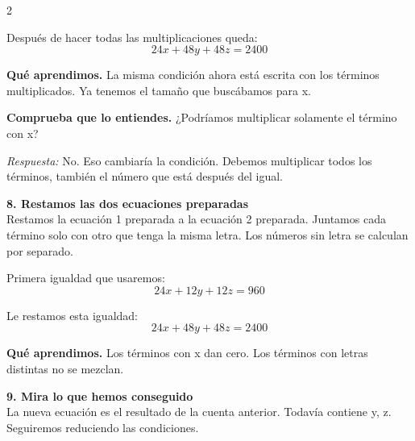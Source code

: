\documentclass[11pt,a4paper,landscape]{article}
\begin{document}
\begin{multicols*}{2}
\begin{minipage}{\linewidth}
\par\smallskip Después de hacer todas las multiplicaciones queda:
\[24x + 48y + 48z = 2400\]
\par\smallskip\textbf{Qué aprendimos.} La misma condición ahora está escrita con los términos multiplicados. Ya tenemos el tamaño que buscábamos para x.
\par\smallskip\textbf{Comprueba que lo entiendes.} ¿Podríamos multiplicar solamente el término con x?\par\textit{Respuesta:} No. Eso cambiaría la condición. Debemos multiplicar todos los términos, también el número que está después del igual.
\end{minipage}\par\medskip
\noindent\begin{minipage}{\linewidth}\textbf{8. Restamos las dos ecuaciones preparadas}\\[2pt]Restamos la ecuación 1 preparada a la ecuación 2 preparada. Juntamos cada término solo con otro que tenga la misma letra. Los números sin letra se calculan por separado.
\par{}\par\smallskip
\par\smallskip Primera igualdad que usaremos:
\[24x + 12y + 12z = 960\]
\par\smallskip Le restamos esta igualdad:
\[24x + 48y + 48z = 2400\]
\par\smallskip\textbf{Qué aprendimos.} Los términos con x dan cero. Los términos con letras distintas no se mezclan.
\end{minipage}\par\medskip
\noindent\begin{minipage}{\linewidth}\textbf{9. Mira lo que hemos conseguido}\\[2pt]La nueva ecuación es el resultado de la cuenta anterior. Todavía contiene y, z. Seguiremos reduciendo las condiciones.

\end{minipage}
\end{multicols*}
\end{document}
